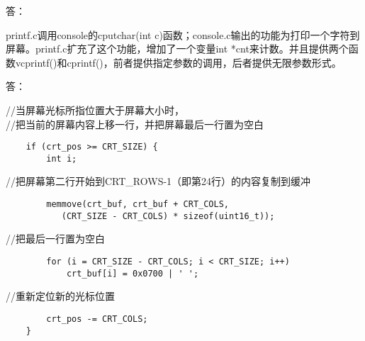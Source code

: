 \documentclass{article}
\begin{document}
\begin{Large}答：\end{Large}
printf.c调用console的cputchar(int c)函数；console.c输出的功能为打印一个字符到屏幕。printf.c扩充了这个功能，增加了一个变量int *cnt来计数。并且提供两个函数vcprintf()和cprintf()，前者提供指定参数的调用，后者提供无限参数形式。\\

\begin{Large}答：\end{Large}
//当屏幕光标所指位置大于屏幕大小时， \\
//把当前的屏幕内容上移一行，并把屏幕最后一行置为空白
\begin{verbatim}
	if (crt_pos >= CRT_SIZE) {
		int i;
\end{verbatim}
\indent //把屏幕第二行开始到CRT\_ROWS-1（即第24行）的内容复制到缓冲
		\begin{verbatim}
		memmove(crt_buf, crt_buf + CRT_COLS, 
		   (CRT_SIZE - CRT_COLS) * sizeof(uint16_t));
		\end{verbatim}
\indent //把最后一行置为空白
		\begin{verbatim}
		for (i = CRT_SIZE - CRT_COLS; i < CRT_SIZE; i++)
			crt_buf[i] = 0x0700 | ' ';
		\end{verbatim}
\indent //重新定位新的光标位置
		\begin{verbatim}
		crt_pos -= CRT_COLS;
	}
	\end{verbatim}
	
\end{document}
